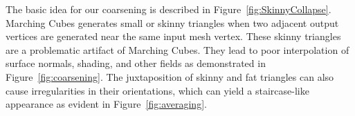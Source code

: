 \documentclass[10pt,journal,cspaper,compsoc]{IEEEtran}
\begin{document}


The basic idea for our coarsening is described in
Figure~\ref{fig:SkinnyCollapse}. Marching Cubes generates small or skinny
triangles when two adjacent output vertices are generated near the same
input mesh vertex.  These skinny triangles are a problematic artifact of
Marching Cubes.  They lead to poor interpolation of surface normals,
shading, and other fields as demonstrated in Figure~\ref{fig:coarsening}.
The juxtaposition of skinny and fat triangles can also cause irregularities
in their orientations, which can yield a staircase-like appearance as
evident in Figure~\ref{fig:averaging}.
\end{document}
